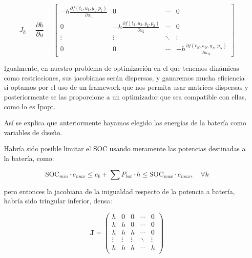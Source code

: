 \begin{equation} \label{eq:diagonal_jacobian}
	J_h = \frac{\partial h}{\partial u} =
	\begin{bmatrix}
		-h \frac{\partial f(t_1, u_1, y_1, p_1)}{\partial u_1} & 0                                                      & \cdots & 0                                                      \\
		0                                                      & -h \frac{\partial f(t_2, u_2, y_2, p_2)}{\partial u_2} & \cdots & 0                                                      \\
		\vdots                                                 & \vdots                                                 & \ddots & \vdots                                                 \\
		0                                                      & 0                                                      & \cdots & -h \frac{\partial f(t_N, u_N, y_N, p_N)}{\partial u_N}
	\end{bmatrix}
\end{equation}

Igualmente, en nuestro problema de optimización en el que tenemos dinámicas
como restricciones, sus jacobianas serán dispersas, y ganaremos mucha eficiencia
si optamos por el uso de un framework que nos permita usar matrices dispersas y
posteriormente se las proporcione a un optimizador que sea compatible con ellas,
como lo es Ipopt.

Así se explica que anteriormente hayamos elegido las energías de la batería como variables
de diseño.

Habría sido posible limitar el SOC usando meramente las potencias destinadas a
la batería, como:

\begin{equation}
	\text{SOC}_{min} \cdot e_{max} \leq e_0 + \sum P_{bat} \cdot h \leq \text{SOC}_{max} \cdot e_{max}, \quad \forall k
\end{equation}

pero entonces la jacobiana de la inigualdad respecto de la potencia a batería,
habría sido tringular inferior, densa:

\begin{equation}
	\mathbf{J} =
	\begin{pmatrix}
		h      & 0      & 0      & \cdots & 0      \\
		h      & h      & 0      & \cdots & 0      \\
		h      & h      & h      & \cdots & 0      \\
		\vdots & \vdots & \vdots & \ddots & \vdots \\
		h      & h      & h      & \cdots & h      \\
	\end{pmatrix}
\end{equation}


